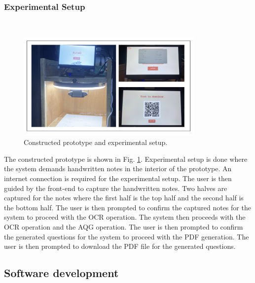 \documentclass[conference]{IEEEtran}
\begin{document}
\subsubsection{Experimental Setup}
\hfill \\
\begin{figure}[H]
\centerline{\includegraphics[width=3.6in]{experimental.png}}
\vspace{-0.4cm}
\caption{Constructed prototype and experimental setup.} 
\label{experimental_setup}
\end{figure}
\vspace{-0.3cm}
\indent The constructed prototype is shown in Fig. \ref{experimental_setup}.
Experimental setup is done where the system demands handwritten notes 
in the interior of the prototype. An internet connection is required for
the experimental setup. The user is then guided by the front-end 
to capture the handwritten notes. Two halves are captured for the
notes where the first half is the top half and the second half is the
bottom half. The user is then prompted to confirm the captured notes
for the system to proceed with the OCR operation. The system then
proceeds with the OCR operation and the AQG operation. The user is then
prompted to confirm the generated questions for the system to proceed
with the PDF generation. The user is then prompted to download the PDF
file for the generated questions.
\hfill
\subsection{Software development}
\end{document}
